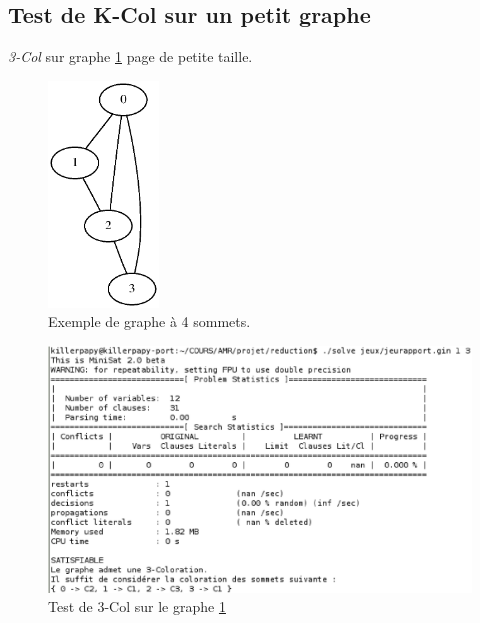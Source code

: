   \subsection{Test de K-Col sur un petit graphe\label{an2}}
  \emph{3-Col} sur graphe \ref{graphe} page \pageref{graphe} de petite
  taille.
  \begin{figure}[!ht]
   \begin{center}
    \includegraphics[height=6cm]{images/jeurap.ps}
    \caption{Exemple de graphe à 4 sommets.\label{graphe}}
   \end{center}
  \end{figure}
  
  \begin{figure}[!ht]
   \begin{center}
    \includegraphics[width=12cm]{images/3-Col.eps}
    \caption{Test de 3-Col sur le graphe \ref{graphe}}
   \end{center}
  \end{figure}
  
